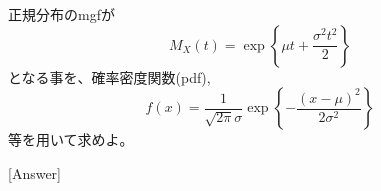 正規分布のmgfが
\[
M_X(t) = \exp \left\{ \mu t + \frac{\sigma^2 t^2}{2} \right\}
\]
となる事を、確率密度関数(pdf),
\[
f(x) = \frac{1}{\sqrt{2\pi}\sigma} \exp \left\{ -\frac{(x - \mu)^2}{2\sigma^2} \right\}
\]
等を用いて求めよ。

[Answer]

